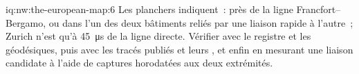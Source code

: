 \begin{solution}{iq:nw:the-european-map:6}
Les planchers indiquent~: près de la ligne Francfort--Bergamo, ou dans l'un des deux bâtiments reliés par une liaison rapide à l'autre~; Zurich n'est qu'à
\qty{45}{\micro\second} de la ligne directe. Vérifier avec le registre et les géodésiques, puis avec les tracés publiés et leurs ,
et enfin en mesurant une liaison candidate à l'aide de captures horodatées aux deux extrémités.
\end{solution}
